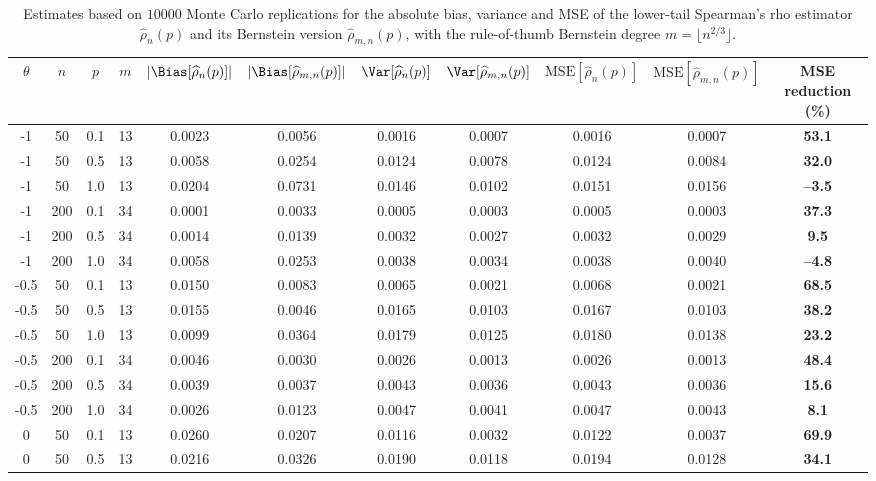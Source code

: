 \begin{table}[ht!]
\centering
\caption{Estimates based on $10000$ Monte Carlo replications for the absolute bias, variance and MSE of the lower-tail Spearman's rho estimator $\widehat{\rho}_n(p)$ and its Bernstein version $\widehat{\rho}_{m,n}(p)$, with the rule-of-thumb Bernstein degree $m = \lfloor n^{2/3} \rfloor$.}
\label{tab:1}
\setlength{\tabcolsep}{4pt}
\small
\begin{tabular}{ccccccccccc}
\hline
$\theta$ & $n$ & $p$ & $m$ & $\lvert\Bias[\widehat{\rho}_n(p)]\rvert$ & $\lvert\Bias[\widehat{\rho}_{m,n}(p)]\rvert$ & $\Var[\widehat{\rho}_n(p)]$ & $\Var[\widehat{\rho}_{m,n}(p)]$ & $\mathrm{MSE}[\widehat{\rho}_n(p)]$ & $\mathrm{MSE}[\widehat{\rho}_{m,n}(p)]$ & MSE reduction (\%) \\
\hline
-1 & 50 & 0.1 & 13 & 0.0023 & 0.0056 & 0.0016 & 0.0007 & 0.0016 & 0.0007 & \textbf{53.1} \\
-1 & 50 & 0.5 & 13 & 0.0058 & 0.0254 & 0.0124 & 0.0078 & 0.0124 & 0.0084 & \textbf{32.0} \\
-1 & 50 & 1.0 & 13 & 0.0204 & 0.0731 & 0.0146 & 0.0102 & 0.0151 & 0.0156 & \textbf{--3.5} \\
\hline
-1 & 200 & 0.1 & 34 & 0.0001 & 0.0033 & 0.0005 & 0.0003 & 0.0005 & 0.0003 & \textbf{37.3} \\
-1 & 200 & 0.5 & 34 & 0.0014 & 0.0139 & 0.0032 & 0.0027 & 0.0032 & 0.0029 & \textbf{9.5} \\
-1 & 200 & 1.0 & 34 & 0.0058 & 0.0253 & 0.0038 & 0.0034 & 0.0038 & 0.0040 & \textbf{--4.8} \\
\hline\hline
-0.5 & 50 & 0.1 & 13 & 0.0150 & 0.0083 & 0.0065 & 0.0021 & 0.0068 & 0.0021 & \textbf{68.5} \\
-0.5 & 50 & 0.5 & 13 & 0.0155 & 0.0046 & 0.0165 & 0.0103 & 0.0167 & 0.0103 & \textbf{38.2} \\
-0.5 & 50 & 1.0 & 13 & 0.0099 & 0.0364 & 0.0179 & 0.0125 & 0.0180 & 0.0138 & \textbf{23.2} \\
\hline
-0.5 & 200 & 0.1 & 34 & 0.0046 & 0.0030 & 0.0026 & 0.0013 & 0.0026 & 0.0013 & \textbf{48.4} \\
-0.5 & 200 & 0.5 & 34 & 0.0039 & 0.0037 & 0.0043 & 0.0036 & 0.0043 & 0.0036 & \textbf{15.6} \\
-0.5 & 200 & 1.0 & 34 & 0.0026 & 0.0123 & 0.0047 & 0.0041 & 0.0047 & 0.0043 & \textbf{8.1} \\
\hline\hline
0 & 50 & 0.1 & 13 & 0.0260 & 0.0207 & 0.0116 & 0.0032 & 0.0122 & 0.0037 & \textbf{69.9} \\
0 & 50 & 0.5 & 13 & 0.0216 & 0.0326 & 0.0190 & 0.0118 & 0.0194 & 0.0128 & \textbf{34.1} \\

\end{tabular}
\end{table}
